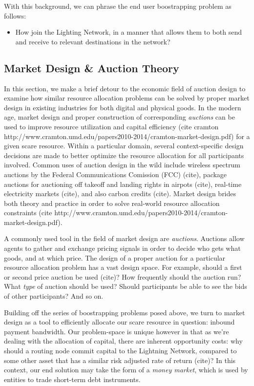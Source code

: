 \documentclass[12pt,a4paper]{article}
\theoremstyle{definition}
\begin{document}
With this background, we can phrase the end user boostrapping problem as
follows:

\begin{itemize}
        \item How join the Lighting Network, in a manner that allows them to
            both send and receive to relevant destinations in the network?
\end{itemize}


\subsection{Market Design \& Auction Theory}

In this section, we make a brief detour to the economic field of auction design
to examine how similar resource allocation problems can be solved by proper
market design in existing industries for both digital and physical goods. In
the modern age, market design and proper construction of corresponding
\emph{auctions} can be used to improve resource utilization and capital
efficiency (cite cramton
http://www.cramton.umd.edu/papers2010-2014/cramton-market-design.pdf) for a
given scare resource. Within a particular domain, several context-specific
design decisions are made to better optimize the resource allocation for all
participants involved. Common uses of auction design in the wild include
wireless spectrum auctions by the Federal Communications Comission (FCC)
(cite), package auctions for auctioning off takeoff and landing rights in
airpots (cite), real-time electricity markets (cite), and also carbon credits
(cite). Market design brides both theory and practice in order to solve
real-world resource allocation constraints (cite
http://www.cramton.umd.edu/papers2010-2014/cramton-market-design.pdf).


A commonly used tool in the field of market design are \emph{auctions}.
Auctions allow agents to gather and exchange pricing signals in order to decide
who gets what goods, and at which price. The design of a proper auction for a
particular resource allocation problem has a vast design space. For example,
should a first or second price auction be used (cite)? How frequently should
the auction run? What \emph{type} of auction should be used? Should
participants be able to see the bids of other participants? And so on.

Building off the series of boostrapping problems posed above, we turn to market
design as a tool to efficiently allocate our scare resource in question:
inbound payment bandwidth. Our problem-space is unique however in that as we're
dealing with the allocation of capital, there are inherent opportunity costs:
why should a routing node commit capital to the Lightning Network, compared to
some other asset that has a similar risk adjusted rate of return (cite)? In
this context, our end solution may take the form of a \emph{money market},
which is used by entities to trade short-term debt instruments.
\end{document}
